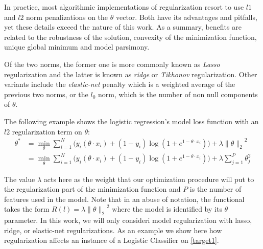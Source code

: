 In practice, most algorithmic implementations of regularization resort to use $l1$ and $l2$ norm penalizations on the $\theta$ vector.
Both have its advantages and pitfalls, yet these details exceed the nature of this work.
As a summary, benefits are related to the robustness of the solution, convexity of the minimization function, unique global minimum and model parsimony.

Of the two norms, the former one is more commonly known as \textit{ Lasso} regularization and the latter is known as \textit{ridge} or \textit{Tikhonov} regularization.
Other variants include the \textit{elastic-net} penalty which is a weighted average of the previous two norms, or the $l_0$ norm, which is the number of non null components of $\theta$.


The following example shows the logistic regression's model loss function with an $l2$ regularization term on $\theta$:
\begin{equation}
\begin{split}
\theta^* & =  \min_{\theta} \sum_{i=1}^N \big(y_i ( \theta \cdot x_i ) + (1- y_i)\log(1 + e^{1- \theta \cdot x_i} ) \big) + \lambda { \| \theta \|_{2}}^2 \\
		& = \min_{\theta} \sum_{i=1}^N \big(y_i ( \theta \cdot x_i ) + (1- y_i)\log(1 + e^{1- \theta \cdot x_i} ) \big) + \lambda \sum_{j=1}^P \theta_j^2
\end{split}
\label{eq:logitRegularization}
\end{equation}




The value $\lambda$ acts here as the weight that our optimization procedure will put to the regularization part of the minimization function and $P$ is the number of features used in the model.
Note that in an abuse of notation, the functional takes the form $R(l) = \lambda { \| \theta \|_{2}}^2$ where the model is identified by its $\theta$ parameter.
In this work, we will only consideri model regularization with lasso, ridge, or elastic-net regularizations.
As an example we show here how regularization affects an instance of a Logistic Classifier on \cref{target1}.

